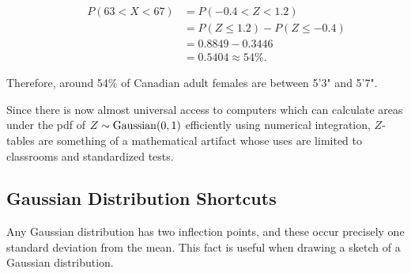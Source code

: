 \begin{example}
\begin{center}
    \begin{minipage}{0.5\textwidth}
        \centering
  $$\begin{aligned}\qquad P(63 < X < 67) &= P(-0.4 < Z < 1.2) \\ &= P(Z \leq 1.2) - P(Z \leq -0.4) \\ &= 0.8849 - 0.3446 \\ &= 0.5404 \approx 54\%.\end{aligned}$$
  \vspace{1.25em}
    \end{minipage}\begin{minipage}{0.5\textwidth}
        \centering
\end{minipage}
\end{center}

Therefore, around 54\% of Canadian adult females are between 5'3" and 5'7".
\end{example}

Since there is now almost universal access to computers which can calculate areas under the pdf of $Z \sim \operatorname{Gaussian}(0,1)$ efficiently using numerical integration, $Z$-tables are something of a mathematical artifact whose uses are limited to classrooms and standardized tests.

\subsection*{Gaussian Distribution Shortcuts}

Any Gaussian distribution has two inflection points, and these occur precisely one standard deviation from the mean. This fact is useful when drawing a sketch of a Gaussian distribution.
\begin{center}    
 \end{center}

